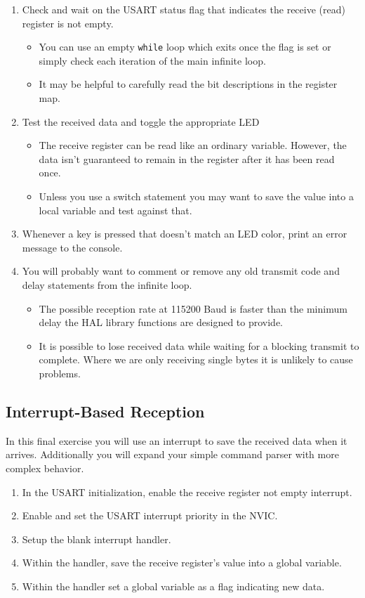 \documentclass[openany,11pt,fleqn]{book} %
\begin{document}
\begin{enumerate}
    \item Check and wait on the USART status flag that indicates the receive (read) register is not empty.
    \begin{itemize}
        \item You can use an empty \texttt{while} loop which exits once the flag is set or simply check each iteration of the main infinite loop. 
        \item It may be helpful to carefully read the bit descriptions in the register map.
    \end{itemize}
    \item Test the received data and toggle the appropriate LED
    \begin{itemize}
        \item The receive register can be read like an ordinary variable. However, the data isn't guaranteed to remain in the register after it has been read once. 
        \item Unless you use a switch statement you may want to save the value into a local variable and test against that. 
    \end{itemize}
    \item Whenever a key is pressed that doesn't match an LED color, print an error message to the console. 
    \item You will probably want to comment or remove any old transmit code and delay statements from the infinite loop. 
    \begin{itemize}
        \item The possible reception rate at 115200 Baud is faster than the minimum delay the HAL library functions are designed to provide. 
        \item It is possible to lose received data while waiting for a blocking transmit to complete. Where we are only receiving single bytes it is unlikely to cause problems.
    \end{itemize}
\end{enumerate}


\subsection{Interrupt-Based Reception}
In this final exercise you will use an interrupt to save the received data when it arrives. Additionally you will expand your simple command parser with more complex behavior.

\begin{enumerate}
    \item In the USART initialization, enable the receive register not empty interrupt.
    \item Enable and set the USART interrupt priority in the NVIC.
    \item Setup the blank interrupt handler.
    \item Within the handler, save the receive register's value into a global variable.
    \item Within the handler set a global variable as a flag indicating new data. 
\end{enumerate} 
\end{document}
